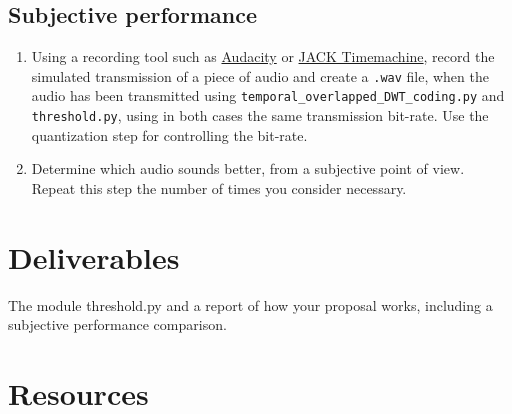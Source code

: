 \subsection{Subjective performance}

\begin{enumerate}
\item Using a recording tool such as
  \href{http://audacity.sourceforge.net}{Audacity} or
  \href{http://plugin.org.uk/timemachine/}{JACK Timemachine}, record
  the simulated transmission of a piece of audio and create a
  \texttt{.wav} file, when the audio has been transmitted using
  \texttt{temporal\_overlapped\_DWT\_coding.py} and
  \texttt{threshold.py}, using in both cases the same transmission
  bit-rate. Use the quantization step for controlling the bit-rate.
\item Determine which audio sounds better, from a subjective point of
  view. Repeat this step the number of times you consider necessary.
\end{enumerate}

\section{Deliverables}

The module threshold.py and a report of how your proposal works,
including a subjective performance comparison.

\section{Resources}



